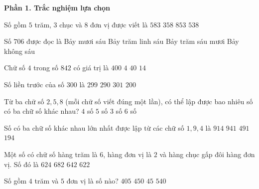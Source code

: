 \textbf{Phần 1. Trắc nghiệm lựa chọn}

\begin{ex} %
Số gồm $5$ trăm, $3$ chục và $8$ đơn vị được viết là
\choice
{$583$}
{$358$}
{$853$}
{\True $538$}
\end{ex}

\begin{ex} %
Số $706$ được đọc là
\choice
{Bảy mươi sáu}
{\True Bảy trăm linh sáu}
{Bảy trăm sáu mươi}
{Bảy không sáu}
\end{ex}

\begin{ex} %
Chữ số $4$ trong số $842$ có giá trị là
\choice
{$400$}
{$4$}
{\True $40$}
{$14$}
\end{ex}

\begin{ex} %
Số liền trước của số $300$ là
\choice
{\True $299$}
{$290$}
{$301$}
{$200$}
\end{ex}

\begin{ex} %
Từ ba chữ số $2, 5, 8$ (mỗi chữ số viết đúng một lần), có thể lập được bao nhiêu số có ba chữ số khác nhau?
\choice
{$4$ số}
{$5$ số}
{$3$ số}
{\True $6$ số}
\end{ex}

\begin{ex} %
Số có ba chữ số khác nhau lớn nhất được lập từ các chữ số $1, 9, 4$ là
\choice
{$914$}
{\True $941$}
{$491$}
{$194$}
\end{ex}

\begin{ex} %
Một số có chữ số hàng trăm là $6$, hàng đơn vị là $2$ và hàng chục gấp đôi hàng đơn vị. Số đó là
\choice
{$624$}
{$682$}
{\True $642$}
{$622$}
\end{ex}

\begin{ex} %
Số gồm $4$ trăm và $5$ đơn vị là số nào?
\choice
{\True $405$}
{$450$}
{$45$}
{$540$}
\end{ex}

